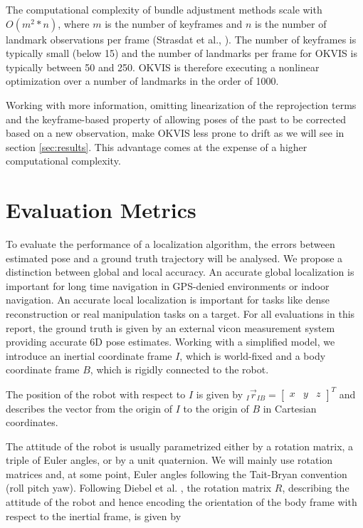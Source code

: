 The computational complexity of bundle adjustment methods scale with $O(m^2*n)$, where $m$ is the number of keyframes and $n$ is the number of landmark observations per frame (Strasdat et al., \cite{strasdat2010real}). The number of keyframes is typically small (below 15) and the number of landmarks per frame for OKVIS is typically between 50 and 250. OKVIS is therefore executing a nonlinear optimization over a number of landmarks in the order of 1000. 

Working with more information, omitting linearization of the reprojection terms and the keyframe-based property of allowing poses of the past to be corrected based on a new observation, make OKVIS less prone to drift as we will see in section \ref{sec:results}. This advantage comes at the expense of a higher computational complexity.



\section{Evaluation Metrics}
\label{sec:metrics}

To evaluate the performance of a localization algorithm, the errors between estimated pose and a ground truth trajectory will be analysed. We propose a distinction between global and local accuracy. An accurate global localization is important for long time navigation in GPS-denied environments or indoor navigation. An accurate local localization is important for tasks like dense reconstruction or real manipulation tasks on a target.
For all evaluations in this report, the ground truth is given by an external vicon measurement system providing accurate 6D pose estimates. Working with a simplified model, we introduce an inertial coordinate frame $I$, which is world-fixed and a body coordinate frame $B$, which is rigidly connected to the robot. 

The position of the robot with respect to $I$ is given by $_I \vec{r}_{IB} = \left[ \begin{array}{ccc} x& y& z \end{array} \right]^T$ and describes the vector from the origin of $I$ to the origin of $B$ in Cartesian coordinates. 

The attitude of the robot is usually parametrized either by a rotation matrix, a triple of Euler angles, or by a unit quaternion. We will mainly use rotation matrices and, at some point, Euler angles following the Tait-Bryan convention (roll pitch yaw). Following Diebel et al. \cite{diebel2006representing}, the rotation matrix $R$, describing the attitude of the robot and hence encoding the orientation of the body frame with respect to the inertial frame, is given by 

